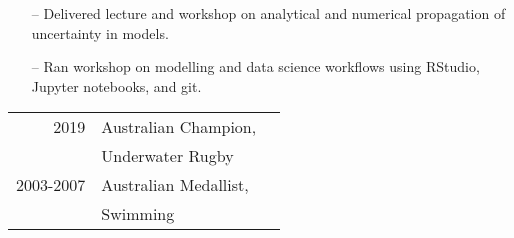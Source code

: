 \documentclass[10pt,a4paper]{altacv}
\begin{document}
\begin{itemize}
    \setlength{\itemindent}{0.5em}
    \item[--]   \small{Delivered lecture and workshop on analytical and numerical propagation of uncertainty in models.}
    \item[--]   \small{Ran workshop on modelling and data science workflows using RStudio, Jupyter notebooks, and git.}
\end{itemize}




\begin{tabular}{rll}
2019 & Australian Champion, &\\
     &   Underwater Rugby   &   \\
2003-2007 & Australian Medallist, & \\
     &     Swimming & \\
\end{tabular}







\end{document}
